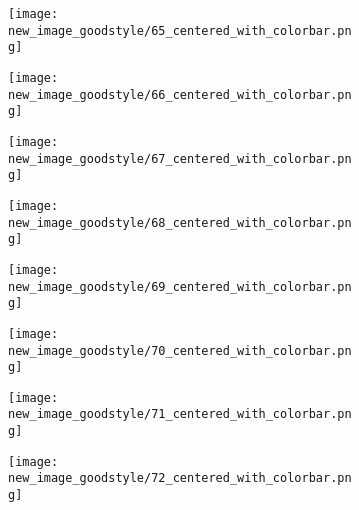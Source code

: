 \documentclass[a4paper,12pt]{article}
\begin{document}
\begin{figure}[H]
  \begin{subfigure}{0.11\textwidth}
    \texttt{[image: new\_image\_goodstyle/65\_centered\_with\_colorbar.png]}
  \end{subfigure}
  \hfill
  \begin{subfigure}{0.11\textwidth}
    \texttt{[image: new\_image\_goodstyle/66\_centered\_with\_colorbar.png]}
  \end{subfigure}
  \hfill
  \begin{subfigure}{0.11\textwidth}
    \texttt{[image: new\_image\_goodstyle/67\_centered\_with\_colorbar.png]}
  \end{subfigure}
  \hfill
  \begin{subfigure}{0.11\textwidth}
    \texttt{[image: new\_image\_goodstyle/68\_centered\_with\_colorbar.png]}
  \end{subfigure}
  \hfill
  \begin{subfigure}{0.11\textwidth}
    \texttt{[image: new\_image\_goodstyle/69\_centered\_with\_colorbar.png]}
  \end{subfigure}
  \hfill
  \begin{subfigure}{0.11\textwidth}
    \texttt{[image: new\_image\_goodstyle/70\_centered\_with\_colorbar.png]}
  \end{subfigure}
  \hfill
  \begin{subfigure}{0.11\textwidth}
    \texttt{[image: new\_image\_goodstyle/71\_centered\_with\_colorbar.png]}
  \end{subfigure}
  \hfill
  \begin{subfigure}{0.11\textwidth}
    \texttt{[image: new\_image\_goodstyle/72\_centered\_with\_colorbar.png]}
  \end{subfigure}
  \hfill
\end{figure}
\end{document}
